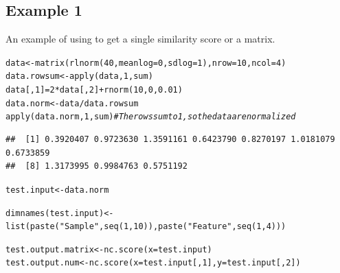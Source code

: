 \documentclass{article}\usepackage[]{graphicx}\usepackage[usenames,dvipsnames]{color}
\newcommand{\hlnum}[1]{\textcolor[rgb]{0.816,0.125,0.439}{#1}}%
\newcommand{\hlstr}[1]{\textcolor[rgb]{0.251,0.627,0.251}{#1}}%
\newcommand{\hlcom}[1]{\textcolor[rgb]{0.502,0.502,0.502}{\textit{#1}}}%
\newcommand{\hlopt}[1]{\textcolor[rgb]{0,0,0}{#1}}%
\newcommand{\hlstd}[1]{\textcolor[rgb]{0.251,0.251,0.251}{#1}}%
\newcommand{\hlkwb}[1]{\textcolor[rgb]{0,0,0}{#1}}%
\newcommand{\hlkwc}[1]{\textcolor[rgb]{0.251,0.251,0.251}{#1}}%
\newcommand{\hlkwd}[1]{\textcolor[rgb]{0.878,0.439,0.125}{#1}}%
\newenvironment{knitrout}{}{} %
\begin{document}
\subsection{Example 1}

An example of using  to get a single similarity score or a matrix.

\begin{knitrout}
\color{fgcolor}\begin{kframe}
\begin{alltt}
\hlstd{data} \hlkwb{<-} \hlkwd{matrix}\hlstd{(}\hlkwd{rlnorm}\hlstd{(}\hlnum{40}\hlstd{,}\hlkwc{meanlog}\hlstd{=}\hlnum{0}\hlstd{,}\hlkwc{sdlog}\hlstd{=}\hlnum{1}\hlstd{),}\hlkwc{nrow}\hlstd{=}\hlnum{10}\hlstd{,}\hlkwc{ncol}\hlstd{=}\hlnum{4}\hlstd{)}
\hlstd{data.rowsum} \hlkwb{<-} \hlkwd{apply}\hlstd{(data,}\hlnum{1}\hlstd{,sum)}
\hlstd{data[,}\hlnum{1}\hlstd{]} \hlkwb{=} \hlnum{2}\hlopt{*}\hlstd{data[,}\hlnum{2}\hlstd{]} \hlopt{+} \hlkwd{rnorm}\hlstd{(}\hlnum{10}\hlstd{,}\hlnum{0}\hlstd{,}\hlnum{0.01}\hlstd{)}
\hlstd{data.norm} \hlkwb{<-} \hlstd{data}\hlopt{/}\hlstd{data.rowsum}
\hlkwd{apply}\hlstd{(data.norm,}\hlnum{1}\hlstd{,sum)}  \hlcom{# The rows sum to 1, so the data are normalized}
\end{alltt}
\begin{verbatim}
##  [1] 0.3920407 0.9723630 1.3591161 0.6423790 0.8270197 1.0181079 0.6733859
##  [8] 1.3173995 0.9984763 0.5751192
\end{verbatim}
\begin{alltt}
\hlstd{test.input} \hlkwb{<-} \hlstd{data.norm}

\hlkwd{dimnames}\hlstd{(test.input)} \hlkwb{<-} \hlkwd{list}\hlstd{(}\hlkwd{paste}\hlstd{(}\hlstr{"Sample"}\hlstd{,}\hlkwd{seq}\hlstd{(}\hlnum{1}\hlstd{,}\hlnum{10}\hlstd{)),}\hlkwd{paste}\hlstd{(}\hlstr{"Feature"}\hlstd{,}\hlkwd{seq}\hlstd{(}\hlnum{1}\hlstd{,}\hlnum{4}\hlstd{)))}

\hlstd{test.output.matrix} \hlkwb{<-} \hlkwd{nc.score}\hlstd{(}\hlkwc{x}\hlstd{=test.input)}
\hlstd{test.output.num}    \hlkwb{<-} \hlkwd{nc.score}\hlstd{(}\hlkwc{x}\hlstd{=test.input[,}\hlnum{1}\hlstd{],}\hlkwc{y}\hlstd{=test.input[,}\hlnum{2}\hlstd{])}
\end{alltt}
\end{kframe}
\end{knitrout}
\end{document}

